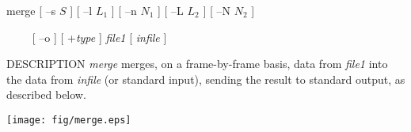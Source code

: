 % 
% 
% 
% 
%                                                                        
%
\hypertarget{merge}{}

\begin{synopsis}
 \item[merge] [ --s $S$ ] [ --l $L_1$ ] [ --n $N_1$ ] [ --L $L_2$ ]
 [ --N $N_2$ ]
 \item[\ ~~~]  [ --o ] [ +{\em type} ] {\em file1} [ {\em infile} ] 
\end{synopsis}

\begin{qsection}{DESCRIPTION}
{\em merge} merges, on a frame-by-frame basis, data from {\em file1} 
into the data from {\em infile} (or standard input), 
sending the result to standard output, as described below.

\hspace{1cm}\texttt{[image: fig/merge.eps]}
\end{qsection}

